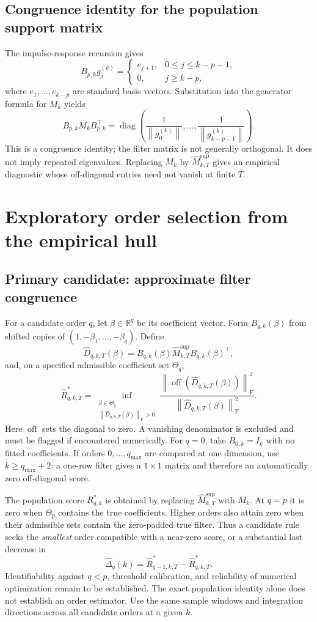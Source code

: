 \documentclass[11pt,a4paper]{article}
\newcommand{\R}{\mathbb R}
\newcommand{\norm}[1]{\left\lVert #1\right\rVert}
\newcommand{\off}{\operatorname{off}}
\newcommand{\Frob}{\mathrm F}
\newcommand{\hM}{\widehat M}
\begin{document}
\subsection*{Congruence identity for the population support matrix}
The impulse-response recursion gives
\[
 B_{p,k}g_j^{(k)}=
 \begin{cases}
 e_{j+1},&0\le j\le k-p-1,\\
 0,&j\ge k-p,
 \end{cases}
\]
where $e_1,\ldots,e_{k-p}$ are standard basis vectors. Substitution into the
generator formula for $M_k$ yields
\[
 \boxed{\quad
 B_{p,k}M_kB_{p,k}^\top
 =\operatorname{diag}\left(
 \frac1{\norm{g_0^{(k)}}},\ldots,\frac1{\norm{g_{k-p-1}^{(k)}}}
 \right).
 \quad}
\]
This is a congruence identity; the filter matrix is not generally orthogonal.
It does not imply repeated eigenvalues. Replacing $M_k$ by
$\hM_{k,T}^{\mathrm{sup}}$ gives an empirical diagnostic whose off-diagonal
entries need not vanish at finite $T$.

\newpage
\section{Exploratory order selection from the empirical hull}\label{sec:order}
\subsection*{Primary candidate: approximate filter congruence}
For a candidate order $q$, let $\beta\in\R^q$ be its coefficient vector.
Form $B_{q,k}(\beta)$ from shifted copies of $(1,-\beta_1,\ldots,-\beta_q)$.
Define
\[
 \widehat D_{q,k,T}(\beta)=
 B_{q,k}(\beta)\hM_{k,T}^{\mathrm{sup}}B_{q,k}(\beta)^\top,
\]
and, on a specified admissible coefficient set $\Theta_q$,
\[
 \boxed{\quad
 \widehat R_{q,k,T}^{*}=
 \inf_{\substack{\beta\in\Theta_q\\\norm{\widehat D_{q,k,T}(\beta)}_{\Frob}>0}}
 \frac{\norm{\off(\widehat D_{q,k,T}(\beta))}_{\Frob}^2}
 {\norm{\widehat D_{q,k,T}(\beta)}_{\Frob}^2}.
 \quad}
\]
Here $\off$ sets the diagonal to zero. A vanishing denominator is excluded and
must be flagged if encountered numerically. For $q=0$, take $B_{0,k}=I_k$ with
no fitted coefficients. If orders $0,\ldots,q_{\max}$ are compared at one dimension,
use $k\ge q_{\max}+2$: a one-row filter gives a $1\times1$ matrix and therefore
an automatically zero off-diagonal score.

The population score $R_{q,k}^{*}$ is obtained by replacing
$\hM_{k,T}^{\mathrm{sup}}$ with $M_k$. At $q=p$ it is zero when $\Theta_p$
contains the true coefficients. Higher orders also attain zero when their
admissible sets contain the zero-padded true filter. Thus a candidate rule seeks
the \emph{smallest} order compatible with a near-zero score, or a substantial last
decrease in
\[
 \widehat\Delta_q(k)=\widehat R_{q-1,k,T}^{*}-\widehat R_{q,k,T}^{*}.
\]
Identifiability against $q<p$, threshold calibration, and reliability of numerical
optimization remain to be established. The exact population identity alone does
not establish an order estimator. Use the same sample windows and integration
directions across all candidate orders at a given $k$.
\end{document}

